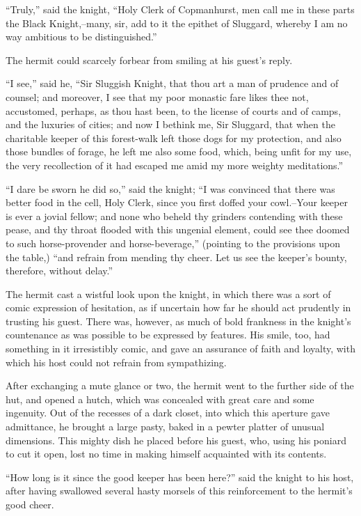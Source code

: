 ``Truly,'' said the knight, ``Holy Clerk of Copmanhurst, men call me in
these parts the Black Knight,--many, sir, add to it the epithet of
Sluggard, whereby I am no way ambitious to be distinguished.''

The hermit could scarcely forbear from smiling at his guest's reply.

``I see,'' said he, ``Sir Sluggish Knight, that thou art a man of
prudence and of counsel; and moreover, I see that my poor monastic fare
likes thee not, accustomed, perhaps, as thou hast been, to the license
of courts and of camps, and the luxuries of cities; and now I bethink
me, Sir Sluggard, that when the charitable keeper of this forest-walk
left those dogs for my protection, and also those bundles of forage, he
left me also some food, which, being unfit for my use, the very
recollection of it had escaped me amid my more weighty meditations.''

``I dare be sworn he did so,'' said the knight; ``I was convinced that
there was better food in the cell, Holy Clerk, since you first doffed
your cowl.--Your keeper is ever a jovial fellow; and none who beheld thy
grinders contending with these pease, and thy throat flooded with this
ungenial element, could see thee doomed to such horse-provender and
horse-beverage,'' (pointing to the provisions upon the table,) ``and
refrain from mending thy cheer. Let us see the keeper's bounty,
therefore, without delay.''

The hermit cast a wistful look upon the knight, in which there was a
sort of comic expression of hesitation, as if uncertain how far he
should act prudently in trusting his guest. There was, however, as much
of bold frankness in the knight's countenance as was possible to be
expressed by features. His smile, too, had something in it irresistibly
comic, and gave an assurance of faith and loyalty, with which his host
could not refrain from sympathizing.

After exchanging a mute glance or two, the hermit went to the further
side of the hut, and opened a hutch, which was concealed with great care
and some ingenuity. Out of the recesses of a dark closet, into which
this aperture gave admittance, he brought a large pasty, baked in a
pewter platter of unusual dimensions. This mighty dish he placed before
his guest, who, using his poniard to cut it open, lost no time in making
himself acquainted with its contents.

``How long is it since the good keeper has been here?'' said the knight
to his host, after having swallowed several hasty morsels of this
reinforcement to the hermit's good cheer.

